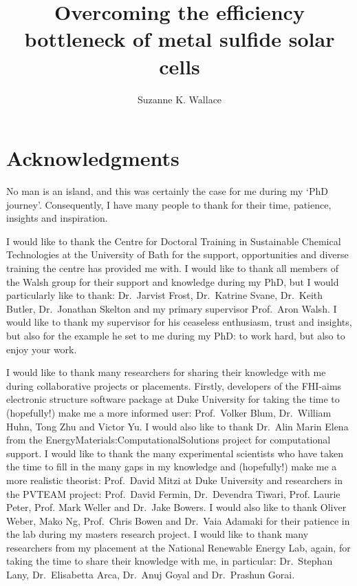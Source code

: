 \documentclass[11pt, twoside]{report}
\title{Overcoming the efficiency bottleneck of metal sulfide solar cells}
\author{Suzanne K. Wallace}
\begin{document}
\maketitle
%

\section*{Acknowledgments}
No man is an island, and this was certainly the case for me during my `PhD journey'. Consequently, I have many people to thank for their time, patience, insights and inspiration. 

I would like to thank the Centre for Doctoral Training in Sustainable Chemical Technologies at the University of Bath for the support, opportunities and diverse training the centre has provided me with. I would like to thank all members of the Walsh group for their support and knowledge during my PhD, but I would particularly like to thank: Dr.~Jarvist Frost, Dr.~Katrine Svane, Dr.~Keith Butler, Dr.~Jonathan Skelton and my primary supervisor Prof.~Aron Walsh. I would like to thank my supervisor for his ceaseless enthusiasm, trust and insights, but also for the example he set to me during my PhD: to work hard, but also to enjoy your work.

I would like to thank many researchers for sharing their knowledge with me during collaborative projects or placements. Firstly, developers of the FHI-aims electronic structure software package at Duke University for taking the time to (hopefully!) make me a more informed user: Prof.~Volker Blum, Dr.~William Huhn, Tong Zhu and Victor Yu. I would also like to thank Dr.~Alin Marin Elena from the EnergyMaterials:ComputationalSolutions project for computational support. I would like to thank the many experimental scientists who have taken the time to fill in the many gaps in my knowledge and (hopefully!) make me a more realistic theorist: Prof.~David Mitzi at Duke University and researchers in the PVTEAM project: Prof.~David Fermin, Dr.~Devendra Tiwari, Prof. Laurie Peter, Prof. Mark Weller and Dr.~Jake Bowers. 
I would also like to thank Oliver Weber, Mako Ng, Prof.~Chris Bowen and Dr.~Vaia Adamaki for their patience in the lab during my masters research project.
I would like to thank many researchers from my placement at the National Renewable Energy Lab, again, for taking the time to share their knowledge with me, in particular: Dr.~Stephan Lany, Dr.~Elisabetta Arca, Dr.~Anuj Goyal and Dr.~Prashun Gorai. 
\end{document}
